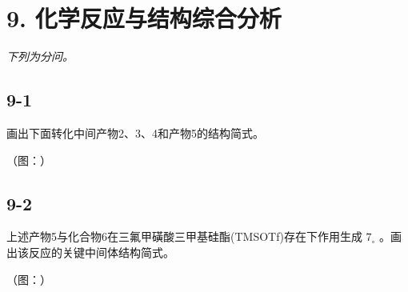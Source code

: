 \section*{9. 化学反应与结构综合分析}
\textit{下列为分问。}

\subsection*{9-1}
画出下⾯转化中间产物2、3、4和产物5的结构简式。

（图：）

\subsection*{9-2}
上述产物5与化合物6在三氟甲磺酸三甲基硅酯(TMSOTf)存在下作⽤⽣成 $7 _ { \circ }$ 。画出该反应的关键中间体结构简式。

（图：）
